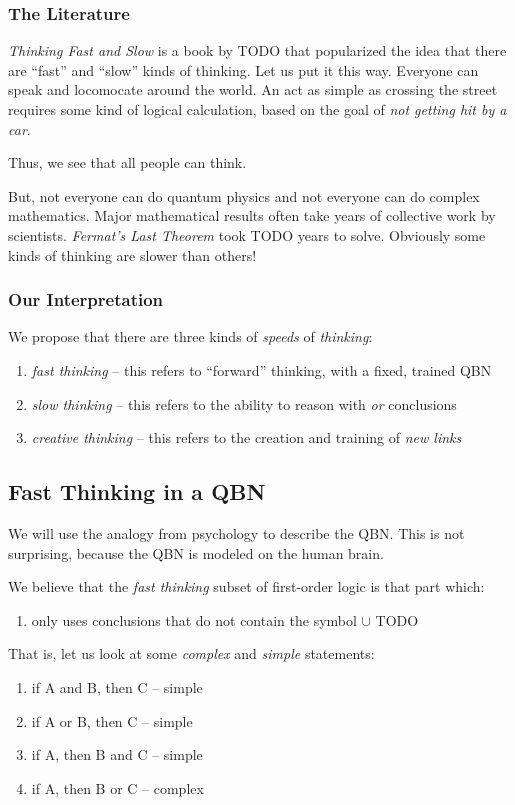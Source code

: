 \documentclass[12pt]{article}
\begin{document}
\subsubsection{The Literature}
{\em Thinking Fast and Slow} is a book by TODO that popularized the idea that there are ``fast'' and ``slow'' kinds of thinking.
Let us put it this way.
Everyone can speak and locomocate around the world.
An act as simple as crossing the street requires some kind of logical calculation, based on the goal of {\em not getting hit by a car}.

Thus, we see that all people can think.


But, not everyone can do quantum physics and not everyone can do complex mathematics.
Major mathematical results often take years of collective work by scientists.
{\em Fermat's Last Theorem} took TODO years to solve.
Obviously some kinds of thinking are slower than others!

\subsubsection{Our Interpretation}
We propose that there are three kinds of {\em speeds} of {\em thinking}:
\begin{enumerate}
    \item {\em fast thinking} -- this refers to ``forward'' thinking, with a fixed, trained QBN
    \item {\em slow thinking} -- this refers to the ability to reason with {\em or} conclusions
    \item {\em creative thinking} -- this refers to the creation and training of {\em new links}
\end{enumerate}

\subsection{Fast Thinking in a QBN}
We will use the analogy from psychology to describe the QBN.
This is not surprising, because the QBN is modeled on the human brain.

We believe that the {\em fast thinking} subset of first-order logic is that part which:
\begin{enumerate}
    \item only uses conclusions that do not contain the symbol $\cup$ TODO
\end{enumerate}

That is, let us look at some {\em complex} and {\em simple} statements:
\begin{enumerate}
    \item if A and B, then C -- simple
    \item if A or B, then C -- simple
    \item if A, then B and C -- simple
    \item if A, then B or C -- complex
\end{enumerate}
\end{document}
